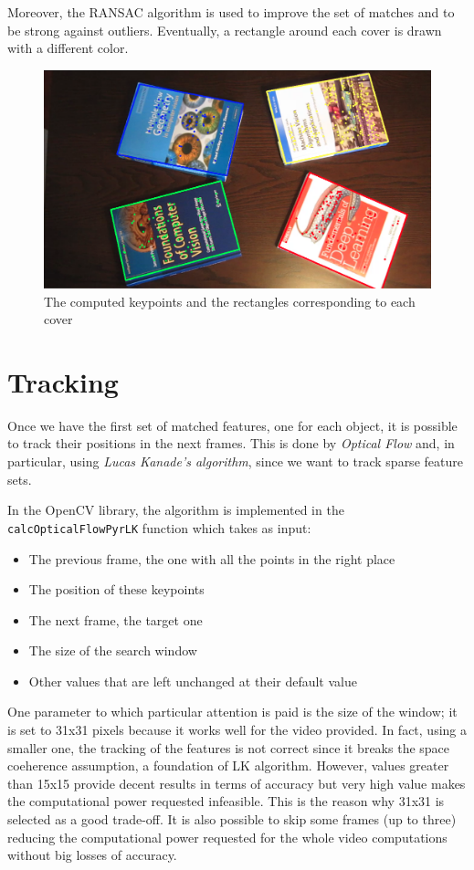 \documentclass[a4paper,titlepaget]{article}
\begin{document}
Moreover, the RANSAC algorithm is used to improve the set of matches and to be strong against outliers.
Eventually, a rectangle around each cover is drawn with a different color.

\begin{figure}[htpb]
	\centering
	\includegraphics[width=.8\textwidth]{images/keypoints-rectangles}
	\caption{The computed keypoints and the rectangles corresponding to each cover}
\end{figure}

\newpage

\section{Tracking}
Once we have the first set of matched features, one for each object, it is possible to track their positions in the next frames. This is done by \emph{Optical Flow} and, in particular, using \emph{Lucas Kanade's algorithm}, since we want to track sparse feature sets. 

In the OpenCV library, the algorithm is implemented in
the \texttt{calcOpticalFlowPyrLK} function which takes as input:
\begin{itemize}
	\item The previous frame, the one with all the points in the right place
	\item The position of these keypoints
	\item The next frame, the target one
	\item The size of the search window
	\item Other values that are left unchanged at their default value 
\end{itemize}
One parameter to which particular attention is paid is the size of the window; it is set to 31x31 pixels because it works well for the video provided.
In fact, using a smaller one, the tracking of the features is not correct since it breaks the space coeherence assumption, a foundation of LK algorithm. 
However, values greater than 15x15 provide decent results in terms of accuracy but very high value makes the computational power requested infeasible. 
This is the reason why 31x31 is selected as a good trade-off. 
It is also possible to skip some frames (up to three) reducing the computational power requested for the whole video computations without big losses of accuracy.
\end{document}
